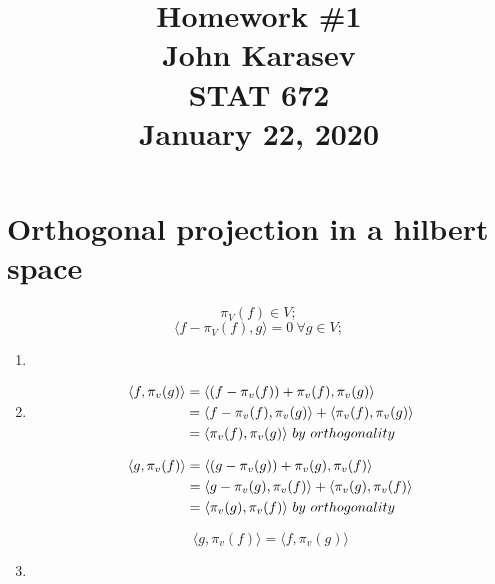 \documentclass{article}
\title{Homework \#1\\ 
    \vspace{0.5cm}
    \normalsize John Karasev\\
    \vspace{0.2cm}
    \normalsize STAT 672\\
    \vspace{0.2cm}
    January 22, 2020 }
\date{}
\begin{document}
\maketitle

\section{Orthogonal projection in a hilbert space}
\[\pi_V(f) \in V;\]
\[\langle f - \pi_V(f), g \rangle =0 \ \forall g \in V; \]
\begin{enumerate}
    \item   

    \item 
        \begin{equation}
        \begin{aligned}
        \langle f, \pi_v(g) \rangle &= \langle (f-\pi_v(f)) + \pi_v(f), \pi_v(g) \rangle \\
        & = \langle f-\pi_v(f) , \pi_v(g) \rangle +  \langle \pi_v(f) , \pi_v(g) \rangle \notag \\
        & = \langle \pi_v(f) , \pi_v(g) \rangle\ by\ orthogonality
        \end{aligned}
        \end{equation} 
        
        \begin{equation}
        \begin{aligned}
        \langle g, \pi_v(f) \rangle &= \langle (g-\pi_v(g)) + \pi_v(g), \pi_v(f) \rangle \\
        & = \langle g-\pi_v(g), \pi_v(f) \rangle +  \langle \pi_v(g) , \pi_v(f) \rangle \notag \\
        & = \langle \pi_v(g) , \pi_v(f) \rangle\ by\ orthogonality
        \end{aligned}
        \end{equation}

        \[ \langle g, \pi_v(f) \rangle = \langle f, \pi_v(g) \rangle\]
    \item 
\end{enumerate}
\end{document}

